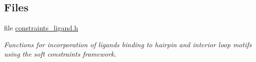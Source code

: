 \subsection*{Files}
\begin{DoxyCompactItemize}
\item 
file \hyperlink{constraints__ligand_8h}{constraints\+\_\+ligand.\+h}
\begin{DoxyCompactList}\small\item\em Functions for incorporation of ligands binding to hairpin and interior loop motifs using the soft constraints framework. \end{DoxyCompactList}\end{DoxyCompactItemize}
